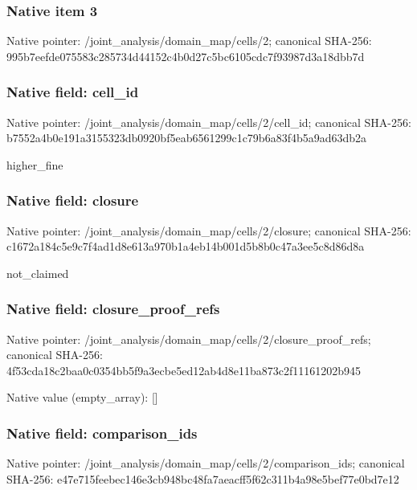 \documentclass[10pt,a4paper]{article}
\begin{document}
\subsubsection{Native item 3}
Native pointer: /joint\_\allowbreak{}analysis/domain\_\allowbreak{}map/cells/2; canonical SHA-256: 995b7eefde075583c285734d44152c4b0d27c5bc6105cdc7f93987d3a18dbb7d

\subsubsection{Native field: cell\_\allowbreak{}id}
Native pointer: /joint\_\allowbreak{}analysis/domain\_\allowbreak{}map/cells/2/cell\_\allowbreak{}id; canonical SHA-256: b7552a4b0e191a3155323db0920bf5eab6561299c1c79b6a83f4b5a9ad63db2a

\begingroup\raggedright\sloppy higher\_\allowbreak{}fine\par\endgroup

\subsubsection{Native field: closure}
Native pointer: /joint\_\allowbreak{}analysis/domain\_\allowbreak{}map/cells/2/closure; canonical SHA-256: c1672a184c5e9c7f4ad1d8e613a970b1a4eb14b001d5b8b0c47a3ee5c8d86d8a

\begingroup\raggedright\sloppy not\_\allowbreak{}claimed\par\endgroup

\subsubsection{Native field: closure\_\allowbreak{}proof\_\allowbreak{}refs}
Native pointer: /joint\_\allowbreak{}analysis/domain\_\allowbreak{}map/cells/2/closure\_\allowbreak{}proof\_\allowbreak{}refs; canonical SHA-256: 4f53cda18c2baa0c0354bb5f9a3ecbe5ed12ab4d8e11ba873c2f11161202b945

Native value (empty\_\allowbreak{}array): []

\subsubsection{Native field: comparison\_\allowbreak{}ids}
Native pointer: /joint\_\allowbreak{}analysis/domain\_\allowbreak{}map/cells/2/comparison\_\allowbreak{}ids; canonical SHA-256: e47e715feebec146e3cb948bc48fa7aeacff5f62c311b4a98e5bef77e0bd7e12
\end{document}
